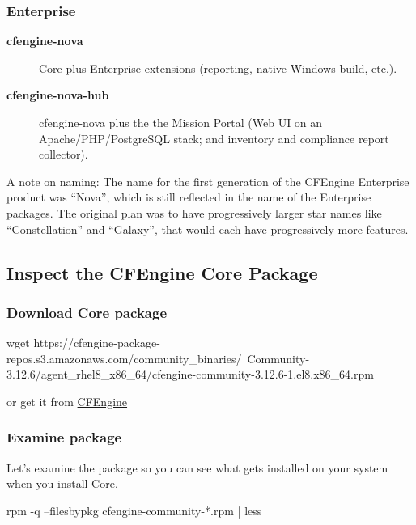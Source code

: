 \subsubsection{Enterprise}

\begin{description}
\item[\textbf{cfengine-nova}] Core plus Enterprise extensions (reporting, native Windows build, etc.).



\item[\textbf{cfengine-nova-hub}] cfengine-nova plus the the Mission Portal (Web UI on an Apache/PHP/PostgreSQL stack; and inventory and compliance report collector).
\end{description}

A note on naming: The name for the first generation of the CFEngine Enterprise product was ``Nova'', which is still reflected in the name of the Enterprise packages. The original plan was to have progressively larger star names like ``Constellation'' and ``Galaxy'', that would each have progressively more features.





\subsection{Inspect the CFEngine Core Package}

\subsubsection{Download Core package}

\begin{code}
wget https://cfengine-package-repos.s3.amazonaws.com/community_binaries/\
Community-3.12.6/agent_rhel8_x86_64/cfengine-community-3.12.6-1.el8.x86_64.rpm
\end{code}
or get it from \href{https://cfengine.com/product/community/}{CFEngine}

\subsubsection{Examine package}

Let's examine the package so you can see what gets installed on your system when you install Core.

\begin{code}
rpm -q --filesbypkg cfengine-community-*.rpm | less
\end{code}





